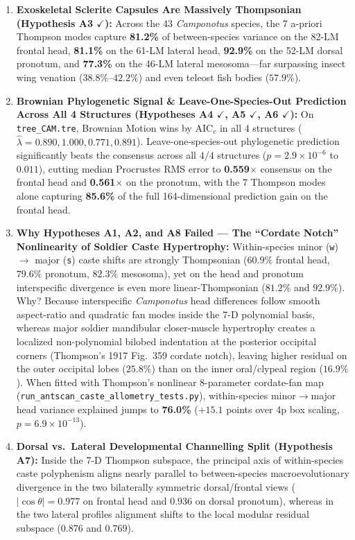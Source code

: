 \documentclass[10pt,twocolumn]{article}
\begin{document}
\begin{enumerate}
  \item \textbf{Exoskeletal Sclerite Capsules Are Massively Thompsonian (Hypothesis A3 $\checkmark$):} Across the 43 \emph{Camponotus} species, the 7 a-priori Thompson modes capture \textbf{81.2\%} of between-species variance on the 82-LM frontal head, \textbf{81.1\%} on the 61-LM lateral head, \textbf{92.9\%} on the 52-LM dorsal pronotum, and \textbf{77.3\%} on the 46-LM lateral mesosoma—far surpassing insect wing venation ($38.8\%\text{--}42.2\%$) and even teleost fish bodies ($57.9\%$).
  \item \textbf{Brownian Phylogenetic Signal \& Leave-One-Species-Out Prediction Across All 4 Structures (Hypotheses A4 $\checkmark$, A5 $\checkmark$, A6 $\checkmark$):} On \texttt{tree\_CAM.tre}, Brownian Motion wins by $\mathrm{AIC}_c$ in all 4 structures ($\hat{\lambda} = 0.890, 1.000, 0.771, 0.891$). Leave-one-species-out phylogenetic prediction significantly beats the consensus across all $4/4$ structures ($p = 2.9\times 10^{-6}$ to $0.011$), cutting median Procrustes RMS error to \textbf{0.559$\times$} consensus on the frontal head and \textbf{0.561$\times$} on the pronotum, with the 7 Thompson modes alone capturing \textbf{85.6\%} of the full 164-dimensional prediction gain on the frontal head.
  \item \textbf{Why Hypotheses A1, A2, and A8 Failed — The ``Cordate Notch'' Nonlinearity of Soldier Caste Hypertrophy:} Within-species minor (\texttt{w}) $\to$ major (\texttt{s}) caste shifts are strongly Thompsonian ($60.9\%$ frontal head, $79.6\%$ pronotum, $82.3\%$ mesosoma), yet on the head and pronotum interspecific divergence is even more linear-Thompsonian ($81.2\%$ and $92.9\%$). Why? Because interspecific \emph{Camponotus} head differences follow smooth aspect-ratio and quadratic fan modes inside the 7-D polynomial basis, whereas major soldier mandibular closer-muscle hypertrophy creates a localized non-polynomial bilobed indentation at the posterior occipital corners (Thompson's 1917 Fig.~359 cordate notch), leaving higher residual on the outer occipital lobes ($25.8\%$) than on the inner oral/clypeal region ($16.9\%$). When fitted with Thompson's nonlinear 8-parameter cordate-fan map (\texttt{run\_antscan\_caste\_allometry\_tests.py}), within-species minor$\to$major head variance explained jumps to \textbf{76.0\%} ($+15.1$ points over 4p box scaling, $p = 6.9 \times 10^{-13}$).
  \item \textbf{Dorsal vs.\ Lateral Developmental Channelling Split (Hypothesis A7):} Inside the 7-D Thompson subspace, the principal axis of within-species caste polyphenism aligns nearly parallel to between-species macroevolutionary divergence in the two bilaterally symmetric dorsal/frontal views ($|\cos\theta| = \mathbf{0.977}$ on frontal head and $\mathbf{0.936}$ on dorsal pronotum), whereas in the two lateral profiles alignment shifts to the local modular residual subspace ($0.876$ and $0.769$).

\end{enumerate}
\end{document}
